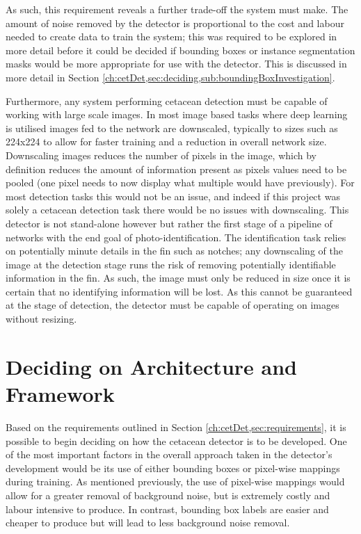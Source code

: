  As such, this requirement reveals a further trade-off the system must make. The amount of noise removed by the detector is proportional to the cost and labour needed to create data to train the system; this was required to be explored in more detail before it could be decided if bounding boxes or instance segmentation masks would be more appropriate for use with the detector. This is discussed in more detail in Section \ref{ch:cetDet,sec:deciding,sub:boundingBoxInvestigation}.
 
 Furthermore, any system performing cetacean detection must be capable of working with large scale images. In most image based tasks where deep learning is utilised images fed to the network are downscaled, typically to sizes such as 224x224 to allow for faster training and a reduction in overall network size. Downscaling images reduces the number of pixels in the image, which by definition reduces the amount of information present as pixels values need to be pooled (one pixel needs to now display what multiple would have previously). For most detection tasks this would not be an issue, and indeed if this project was solely a cetacean detection task there would be no issues with downscaling. This detector is not stand-alone however but rather the first stage of a pipeline of networks with the end goal of photo-identification. The identification task relies on potentially minute details in the fin such as notches; any downscaling of the image at the detection stage runs the risk of removing potentially identifiable information in the fin. As such, the image must only be reduced in size once it is certain that no identifying information will be lost. As this cannot be guaranteed at the stage of detection, the detector must be capable of operating on images without resizing.
 
\section{Deciding on Architecture and Framework}\label{ch:cetDet,sec:deciding}

Based on the requirements outlined in Section \ref{ch:cetDet,sec:requirements}, it is possible to begin deciding on how the cetacean detector is to be developed. One of the most important factors in the overall approach taken in the detector's development would be its use of either bounding boxes or pixel-wise mappings during training. As mentioned previously, the use of pixel-wise mappings would allow for a greater removal of background noise, but is extremely costly and labour intensive to produce. In contrast, bounding box labels are easier and cheaper to produce but will lead to less background noise removal. 

